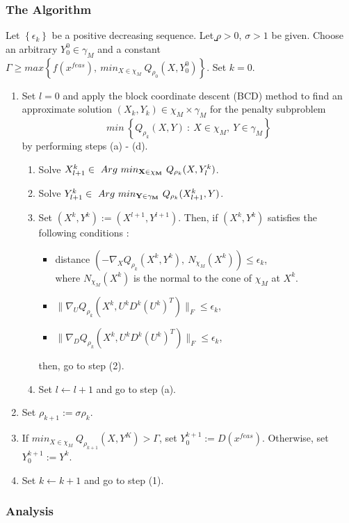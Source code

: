 \documentclass[letterpaper, 10 pt, conference]{article}
\begin{document}
\subsubsection{The Algorithm}

Let $\left\lbrace\epsilon_k\right\rbrace$ be a positive decreasing sequence. Let ̺$\rho > 0$, $\sigma > 1$ be given. Choose an arbitrary $Y_0^0\in{\gamma_M}$ and a constant $\Gamma\geq max\left\lbrace{f(x^{feas}),\ min_{X\in{\chi_M}}\ Q_{\rho_0}(X,Y_0^0)}\right\rbrace$. Set $k=0$.
\begin{enumerate}
\item Set $l=0$ and apply the block coordinate descent (BCD) method \cite{BCD} to find an approximate solution $(X_k,Y_k)\in \chi_M \times \gamma_M$ for the penalty subproblem
$$ min\ \left\lbrace{Q_{\rho_k}(X,Y)\ :\ X\in\chi_M,\ Y\in{{\gamma}_M}}\right\rbrace $$
by performing steps (a) - (d).
\begin{enumerate}
\item Solve $ X_{l+1}^k \in\ Arg\ min_{\bf X\in{\chi_M}}\ Q_{\rho_k}(X,Y_l^k)$.
\item Solve $ Y_{l+1}^k \in\ Arg\ min_{\bf Y\in{\gamma_M}}\ Q_{\rho_k}(X_{l+1}^k,Y)$.
\item Set $(X^k,Y^k):=(X^{l+1},Y^{l+1})$. Then, if $(X^k,Y^k)$ satisfies the following conditions :
\begin{itemize}
\item distance $(-\nabla_{X}Q_{\rho_k}(X^k,Y^k),\ N_{{\chi}_M}(X^k))\leq{\epsilon_k}$, \\
where $N_{{\chi}_M}(X^k)$ is the normal to the cone of $\chi_M$ at $X^k$.
\item $\|\nabla_{U}Q_{\rho_k}(X^k,U^kD^k(U^k)^T)\|_F\leq\epsilon_k$,
\item $\|\nabla_{D}Q_{\rho_k}(X^k,U^kD^k(U^k)^T)\|_F\leq\epsilon_k$,
\end{itemize}
then, go to step (2).
\item Set $l\leftarrow l+1$ and go to step (a).
\end{enumerate}

\item Set $\rho_{k+1}:=\sigma\rho_k.$
\item If $min_{X\in\chi_M}\ Q_{\rho_{k+1}}(X,Y^K)>\Gamma$, set $Y_0^{k+1}:=D(x^{feas})$. Otherwise, set $Y_0^{k+1}:=Y^k$.
\item Set $k\leftarrow k+1$ and go to step (1).
\end{enumerate}

\subsubsection{Analysis}
\end{document}
